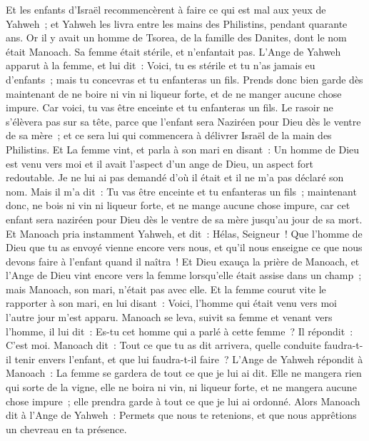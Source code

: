 \begin{multicols}{2}
\VerseOne{}Et les enfants d'Israël recommencèrent à faire ce qui est mal aux yeux de Yahweh~; et Yahweh les livra entre les mains des Philistins, pendant quarante ans.
Or il y avait un homme de Tsorea, de la famille des Danites, dont le nom était Manoach. Sa femme était stérile, et n'enfantait pas.
L'Ange de Yahweh apparut à la femme, et lui dit~: Voici, tu es stérile et tu n'as jamais eu d'enfants~; mais tu concevras et tu enfanteras un fils.
Prends donc bien garde dès maintenant de ne boire ni vin ni liqueur forte, et de ne manger aucune chose impure.
Car voici, tu vas être enceinte et tu enfanteras un fils. Le rasoir ne s'élèvera pas sur sa tête, parce que l'enfant sera Naziréen pour Dieu dès le ventre de sa mère~; et ce sera lui qui commencera à délivrer Israël de la main des Philistins.
Et La femme vint, et parla à son mari en disant~: Un homme de Dieu est venu vers moi et il avait l'aspect d'un ange de Dieu, un aspect fort redoutable. Je ne lui ai pas demandé d'où il était et il ne m'a pas déclaré son nom.
Mais il m'a dit~: Tu vas être enceinte et tu enfanteras un fils~; maintenant donc, ne bois ni vin ni liqueur forte, et ne mange aucune chose impure, car cet enfant sera naziréen pour Dieu dès le ventre de sa mère jusqu'au jour de sa mort.
Et Manoach pria instamment Yahweh, et dit~: Hélas, Seigneur~! Que l'homme de Dieu que tu as envoyé vienne encore vers nous, et qu'il nous enseigne ce que nous devons faire à l'enfant quand il naîtra~!
Et Dieu exauça la prière de Manoach, et l'Ange de Dieu vint encore vers la femme lorsqu'elle était assise dans un champ~; mais Manoach, son mari, n'était pas avec elle.
Et la femme courut vite le rapporter à son mari, en lui disant~: Voici, l'homme qui était venu vers moi l'autre jour m'est apparu.
Manoach se leva, suivit sa femme et venant vers l'homme, il lui dit~: Es-tu cet homme qui a parlé à cette femme~? Il répondit~: C'est moi.
Manoach dit~: Tout ce que tu as dit arrivera, quelle conduite faudra-t-il tenir envers l'enfant, et que lui faudra-t-il faire~?
L'Ange de Yahweh répondit à Manoach~: La femme se gardera de tout ce que je lui ai dit.
Elle ne mangera rien qui sorte de la vigne, elle ne boira ni vin, ni liqueur forte, et ne mangera aucune chose impure~; elle prendra garde à tout ce que je lui ai ordonné.
Alors Manoach dit à l'Ange de Yahweh~: Permets que nous te retenions, et que nous apprêtions un chevreau en ta présence.

\end{multicols}

